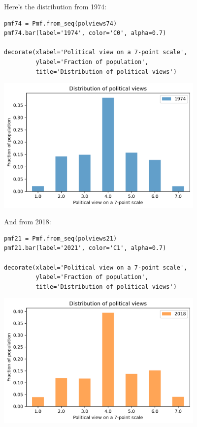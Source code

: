 Here's the distribution from 1974:

\begin{lstlisting}[]
pmf74 = Pmf.from_seq(polviews74)
pmf74.bar(label='1974', color='C0', alpha=0.7)

decorate(xlabel='Political view on a 7-point scale',
         ylabel='Fraction of population',
         title='Distribution of political views')
\end{lstlisting}

\begin{center}
\includegraphics[width=4in]{chapters/02_polviews_soln_files/02_polviews_soln_32_0.png}
\end{center}

And from 2018:

\begin{lstlisting}[]
pmf21 = Pmf.from_seq(polviews21)
pmf21.bar(label='2021', color='C1', alpha=0.7)

decorate(xlabel='Political view on a 7-point scale',
         ylabel='Fraction of population',
         title='Distribution of political views')
\end{lstlisting}

\begin{center}
\includegraphics[width=4in]{chapters/02_polviews_soln_files/02_polviews_soln_34_0.png}
\end{center}

